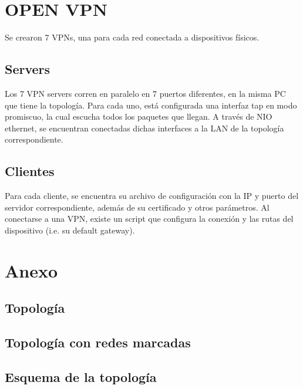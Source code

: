 \documentclass[12pt,a4paper,spanish]{article}
\begin{document}
\section{OPEN VPN}
Se crearon 7 VPNs, una para cada red conectada a dispositivos físicos.
\subsection{Servers}
Los 7 VPN servers corren en paralelo en 7 puertos diferentes, en la misma PC que tiene la topología.
Para cada uno, está configurada una interfaz tap en modo promiscuo, la cual escucha todos los paquetes que llegan.
A través de NIO ethernet, se encuentran conectadas dichas interfaces a la LAN de la topología correspondiente.
\subsection{Clientes}
Para cada cliente, se encuentra su archivo de configuración con la IP y puerto del servidor correspondiente, además de su certificado
y otros parámetros.
Al conectarse a una VPN, existe un script que configura la conexión y las rutas del dispositivo (i.e. su default gateway).

\newpage
\section{Anexo}
\subsection{Topología}
\subsection{Topología con redes marcadas}

\subsection{Esquema de la topología}
\end{document}
